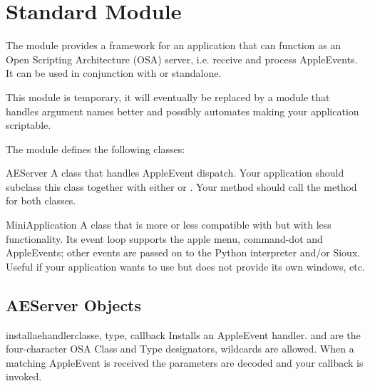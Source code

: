 \section{Standard Module }
\label{module-MiniAEFrame}

The module  provides a framework for an application
that can function as an Open Scripting Architecture
(OSA) server, i.e. receive and process
AppleEvents. It can be used in conjunction with
 or standalone.

This module is temporary, it will eventually be replaced by a module
that handles argument names better and possibly automates making your
application scriptable.

The  module defines the following classes:


\begin{classdesc}{AEServer}{}
A class that handles AppleEvent dispatch. Your application should
subclass this class together with either
 or
. Your  method should
call the  method for both classes.
\end{classdesc}

\begin{classdesc}{MiniApplication}{}
A class that is more or less compatible with
 but with less functionality. Its
event loop supports the apple menu, command-dot and AppleEvents; other
events are passed on to the Python interpreter and/or Sioux.
Useful if your application wants to use  but does not
provide its own windows, etc.
\end{classdesc}


\subsection{AEServer Objects}
\label{aeserver-objects}

\begin{methoddesc}[AEServer]{installaehandler}{classe, type, callback}
Installs an AppleEvent handler.  and  are the
four-character OSA Class and Type designators,  wildcards
are allowed. When a matching AppleEvent is received the parameters are
decoded and your callback is invoked.
\end{methoddesc}

